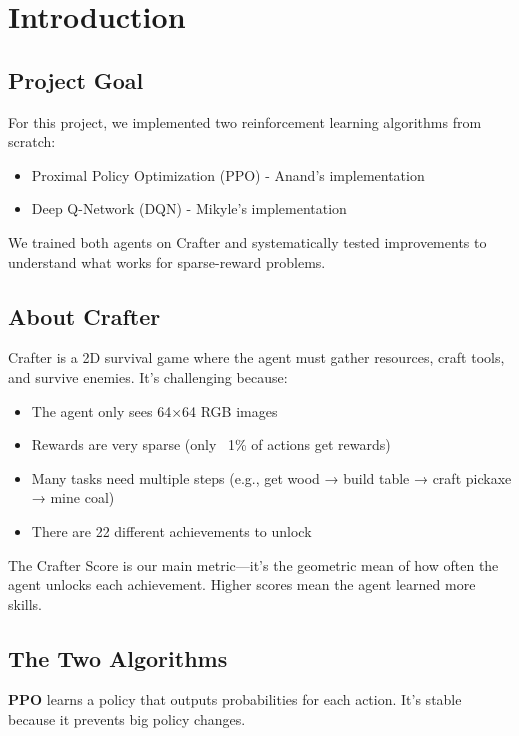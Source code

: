 \documentclass[conference]{IEEEtran}
\begin{document}
\section{Introduction}

\subsection{Project Goal}

For this project, we implemented two reinforcement learning algorithms from scratch:
\begin{itemize}
    \item Proximal Policy Optimization (PPO) - Anand's implementation
    \item Deep Q-Network (DQN) - Mikyle's implementation
\end{itemize}

We trained both agents on Crafter and systematically tested improvements to understand what works for sparse-reward problems.

\subsection{About Crafter}

Crafter is a 2D survival game where the agent must gather resources, craft tools, and survive enemies. It's challenging because:

\begin{itemize}
    \item The agent only sees 64×64 RGB images
    \item Rewards are very sparse (only ~1\% of actions get rewards)
    \item Many tasks need multiple steps (e.g., get wood → build table → craft pickaxe → mine coal)
    \item There are 22 different achievements to unlock
\end{itemize}

The Crafter Score is our main metric—it's the geometric mean of how often the agent unlocks each achievement. Higher scores mean the agent learned more skills.

\subsection{The Two Algorithms}

\textbf{PPO} learns a policy that outputs probabilities for each action. It's stable because it prevents big policy changes.
\end{document}

